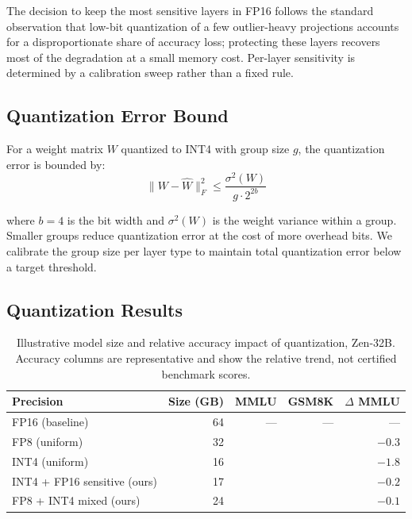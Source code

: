 \documentclass[11pt,a4paper]{article}
\begin{document}
The decision to keep the most sensitive layers in FP16 follows the standard observation
that low-bit quantization of a few outlier-heavy projections accounts for a
disproportionate share of accuracy loss; protecting these layers recovers most of the
degradation at a small memory cost. Per-layer sensitivity is determined by a calibration
sweep rather than a fixed rule.

\subsection{Quantization Error Bound}

For a weight matrix $W$ quantized to INT4 with group size $g$, the quantization error
is bounded by:
\begin{equation}
    \|W - \hat{W}\|_F^2 \leq \frac{\sigma^2(W)}{g \cdot 2^{2b}}
    \label{eq:quant_error}
\end{equation}

where $b = 4$ is the bit width and $\sigma^2(W)$ is the weight variance within a group.
Smaller groups reduce quantization error at the cost of more overhead bits. We calibrate
the group size per layer type to maintain total quantization error below a target threshold.

\subsection{Quantization Results}

\begin{table}[H]
\centering
\caption{Illustrative model size and relative accuracy impact of quantization, Zen-32B.
Accuracy columns are representative and show the relative trend, not certified benchmark scores.}
\begin{tabular}{lrrrr}
\toprule
\textbf{Precision} & \textbf{Size (GB)} & \textbf{MMLU} & \textbf{GSM8K} & \textbf{$\Delta$ MMLU} \\
\midrule
FP16 (baseline)                  & 64 & --- & --- & --- \\
FP8 (uniform)                    & 32 & & & $-0.3$ \\
INT4 (uniform)                   & 16 & & & $-1.8$ \\
INT4 + FP16 sensitive (ours)     & 17 & & & $-0.2$ \\
FP8 + INT4 mixed (ours)          & 24 & & & $-0.1$ \\
\bottomrule
\end{tabular}
\label{tab:quantization}
\end{table}
\end{document}
